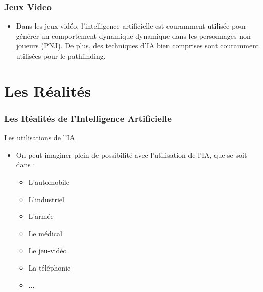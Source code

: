 \documentclass{beamer}
\begin{document}
 	
 	\begin{frame}
 	   \frametitle{Jeux Video}
 	   \begin{itemize}
 	       \item Dans les jeux vidéo, l'intelligence artificielle est couramment utilisée pour générer un comportement dynamique dynamique dans les personnages non-joueurs (PNJ). De plus, des techniques d'IA bien comprises sont couramment utilisées pour le pathfinding.
 	   \end{itemize}
 	\end{frame}
	
	
	\section{Les Réalités}
	\begin{frame}
	\frametitle{Les Réalités de l'Intelligence Artificielle}
	\begin{block}{Les utilisations de l'IA}
	\begin{itemize}
	\itemsep1em
		\item On peut imaginer plein de possibilité avec l'utilisation de l'IA, que se soit dans :
		\begin{itemize}
		\itemsep1em
		\item L'automobile
		\item L'industriel
		\item L'armée
		\item Le médical
		\item Le jeu-vidéo
		\item La téléphonie
		\item ...
		\end{itemize}
		\end{itemize}
	\end{block}
	\end{frame}
	
\end{document}
